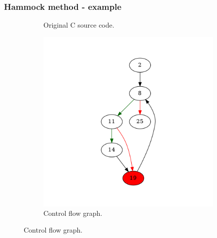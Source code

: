 \documentclass[aspectratio=1610]{beamer}
\begin{document}
\begin{frame}
	\frametitle{Hammock method - example}
	\begin{figure}[htbp]
		\centering
		\begin{subfigure}[b]{0.30\textwidth}
			\centering
			
			\caption{Original C source code.}
		\end{subfigure}
		\begin{subfigure}[b]{0.50\textwidth}
			\centering
			\includegraphics[height=0.6\paperheight]{inc/methods/hammock/example/without-break/main_0001b.png}
			\caption{Control flow graph.}
		\end{subfigure}
	\end{figure}
\end{frame}
\end{document}
